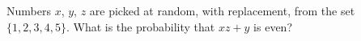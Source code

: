 Numbers $x$, $y$, $z$ are picked at random, with replacement, from the set $\{1,2,3,4,5\}$. What is the probability that $xz+y$ is even?
